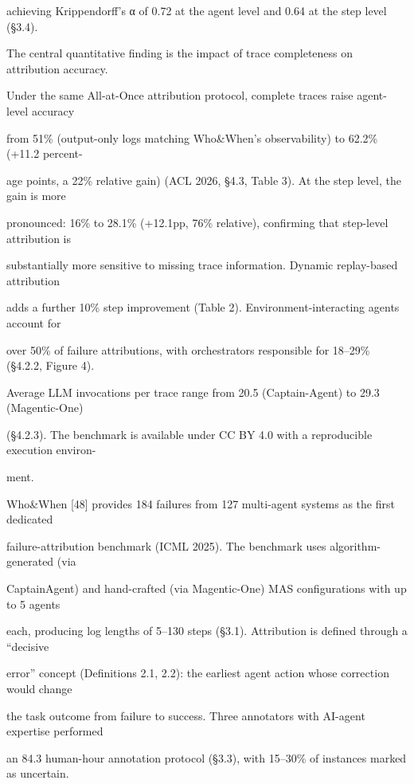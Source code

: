 \begin{flushleft}
\noindent achieving Krippendorff’s α of 0.72 at the agent level and 0.64 at the step level (§3.4).\par
\noindent  The central quantitative finding is the impact of trace completeness on attribution accuracy.\par
\noindent Under the same All-at-Once attribution protocol, complete traces raise agent-level accuracy\par
\noindent from 51\% (output-only logs matching Who\&When’s observability) to 62.2\% (+11.2 percent-\par
\noindent age points, a 22\% relative gain) (ACL 2026, §4.3, Table 3). At the step level, the gain is more\par
\noindent pronounced: 16\% to 28.1\% (+12.1pp, 76\% relative), confirming that step-level attribution is\par
\noindent substantially more sensitive to missing trace information. Dynamic replay-based attribution\par
\noindent adds a further 10\% step improvement (Table 2). Environment-interacting agents account for\par
\noindent over 50\% of failure attributions, with orchestrators responsible for 18–29\% (§4.2.2, Figure 4).\par
\noindent Average LLM invocations per trace range from 20.5 (Captain-Agent) to 29.3 (Magentic-One)\par
\noindent (§4.2.3). The benchmark is available under CC BY 4.0 with a reproducible execution environ-\par
\noindent ment.\par
\noindent  Who\&When [48] provides 184 failures from 127 multi-agent systems as the first dedicated\par
\noindent failure-attribution benchmark (ICML 2025). The benchmark uses algorithm-generated (via\par
\noindent CaptainAgent) and hand-crafted (via Magentic-One) MAS configurations with up to 5 agents\par
\noindent each, producing log lengths of 5–130 steps (§3.1). Attribution is defined through a “decisive\par
\noindent error” concept (Definitions 2.1, 2.2): the earliest agent action whose correction would change\par
\noindent the task outcome from failure to success. Three annotators with AI-agent expertise performed\par
\noindent an 84.3 human-hour annotation protocol (§3.3), with 15–30\% of instances marked as uncertain.\par

\end{flushleft}
